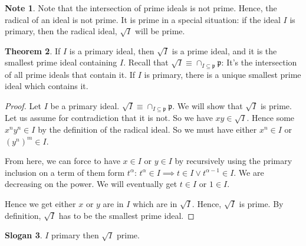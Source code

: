 \documentclass{book}
\newcommand{\p}{\mathfrak{p}}
\newcommand{\rad}{\sqrt} %
\theoremstyle{definition}
\newtheorem{theorem}{Theorem}
\newtheorem{note}[theorem]{Note}
\newtheorem{slogan}[theorem]{Slogan}
\begin{document}
\begin{note}
Note that the intersection of prime ideals is not prime. Hence, the radical
of an ideal is not prime. It is prime in a special situation: if the ideal $I$
is primary, then the radical ideal, $\rad I$ will be prime.
\end{note}

\begin{theorem}
If $I$ is a primary ideal, then $\rad I$ is a prime ideal, and it is
the smallest prime ideal containing $I$. Recall that $\rad I \equiv \cap_{I \subseteq \p} \p$:
It's the intersection of all prime ideals that contain it. If $I$ is primary,
there is a unique smallest prime ideal which contains it.
\end{theorem}
\begin{proof}
Let $I$ be a primary ideal. $\rad I \equiv \cap_{I \subseteq \p} \p$.
We will show that $\rad I$ is prime. 
Let us assume for contradiction that it is not.
So we have $xy \in \rad I$. Hence some $x^ny^n \in I$ by the definition
of the radical ideal. So we must have either $x^n \in I$ or $(y^n)^m \in I$.


From here, we can force to have $x \in I$ or $y \in I$ by recursively
using the primary inclusion on a term of them form $t^\alpha$: $t^\alpha \in I \implies
t \in I \lor t^{\alpha-1} \in I$. We are decreasing on the power. We will eventually
get $t \in I$ or $1 \in I$.

Hence we get either $x$ or $y$ are in $I$ which are in $\rad I$. Hence,
$\rad I$ is prime. By definition, $\rad I$ has to be the smallest prime ideal.
\end{proof}
\begin{slogan} $I$ primary then $\rad I$ prime. \end{slogan}
\end{document}
